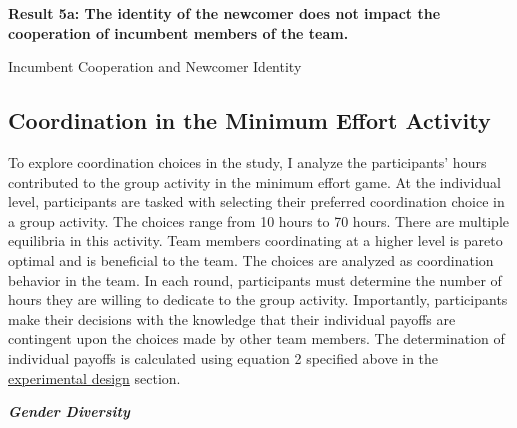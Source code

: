 \textbf{Result 5a: The identity of the newcomer does not impact the cooperation of incumbent members of the team.}
\begin{table}[H]
 \captionsetup{justification=raggedright,singlelinecheck=false}
\caption{Incumbent Cooperation and Newcomer Identity } \label{tab:table7}
    \begin{center}
        
    \end{center}
\end{table}

\subsection{Coordination in the Minimum Effort Activity}

\noindent To explore coordination choices in the study, I analyze the participants' hours contributed to the group activity in the minimum effort game. At the individual level, participants are tasked with selecting their preferred coordination choice in a group activity. The choices range from 10 hours to 70 hours. There are multiple equilibria in this activity. Team members coordinating at a higher level is pareto optimal and is beneficial to the team. The choices are analyzed as coordination behavior in the team. In each round, participants must determine the number of hours they are willing to dedicate to the group activity. Importantly, participants make their decisions with the knowledge that their individual payoffs are contingent upon the choices made by other team members. The determination of individual payoffs is calculated using equation 2 specified above in the \hyperref[subsec:Design]{experimental design} section.

\noindent\textbf{\textit{Gender Diversity}} 

